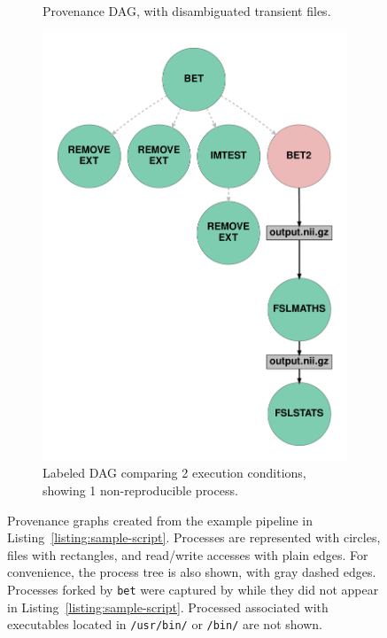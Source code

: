 \begin{figure}
\begin{subfigure}[t]{0.3\linewidth}
    \caption{Provenance DAG, with disambiguated transient files.}
    \label{fig:provenance-dag}
  \end{subfigure}
  \hfill
  \begin{subfigure}[t]{0.3\linewidth}
      \centering
      \includegraphics[width=.7\linewidth]{chapters/chapter1/figures/p-graph-dag-labelled.pdf}
     \caption{Labeled DAG comparing 2 execution conditions, showing 1 non-reproducible process.}
     \label{fig:labeled-dag}
  \end{subfigure}
    \caption{Provenance graphs created from the example pipeline in
    Listing~\ref{listing:sample-script}. Processes are represented with
    circles, files with rectangles, and read/write accesses with plain edges. For convenience, the process tree
    is also shown, with gray dashed edges. Processes forked by
    \texttt{bet} were captured by \reprozip while they did not appear in
    Listing~\ref{listing:sample-script}. Processed associated with
    executables located in \texttt{/usr/bin/} or \texttt{/bin/} are not shown.}
    \label{fig:spot-example}
  \end{figure}

